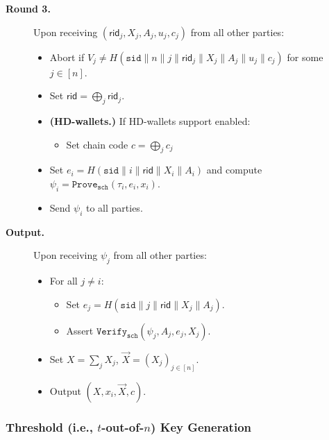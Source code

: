 \documentclass[11pt]{article}
\newcommand{\sid}{\ensuremath{\mathtt{sid}}}
\newcommand{\prove}[1]{\ensuremath{\mathtt{Prove}_{\mathtt{#1}}}}
\newcommand{\verify}[1]{\ensuremath{\mathtt{Verify}_{\mathtt{#1}}}}
\newcommand{\rid}{\textsf{rid}}
\newcommand{\?}[1]{\stackrel{?}{#1}}
\begin{document}
\begin{description}
\item[\bf Round 3.] 
    Upon receiving $(\rid_j, X_j, A_j, u_j, c_j)$ from all other parties:
    \begin{itemize}
    \item Abort if $V_j \neq H(\sid \| n \| j \| \rid_j \| X_j \| A_j \| u_j \| c_j)$
          for some $j \in [n]$.
    \item Set $\rid = \bigoplus_j \rid_j$.
    \item {\bf (HD-wallets.)} If HD-wallets support enabled:
    \begin{itemize}
      \item Set chain code $c = \bigoplus_j c_j$
    \end{itemize}
    \item Set $e_i = H(\sid \| i \| \rid \| X_i\|A_i)$
          and compute $\psi_i = \prove{sch}(\tau_i, e_i, x_i)$.
    \item Send $\psi_i$ to all parties.
    \end{itemize}

\item[\bf Output.] 
    Upon receiving $\psi_j$ from all other parties:
    \begin{itemize}
    \item 
        For all $j \ne i$:
        \begin{itemize}
            \item Set $e_j = H(\sid \| j \| \rid\|X_j\|A_j)$.
            \item Assert $\verify{sch}(\psi_j, A_j, e_j, X_j)$.
        \end{itemize}

    \item Set $X = \sum_j X_j$,
              $\vec X = (X_j)_{j\in[n]}$.

    \item Output $(X, x_i, \vec X, c)$.
    \end{itemize}

\end{description}

\subsubsection{Threshold (i.e., $t$-out-of-$n$) Key Generation}
\label{sec:t-of-n-dkg}
\end{document}
